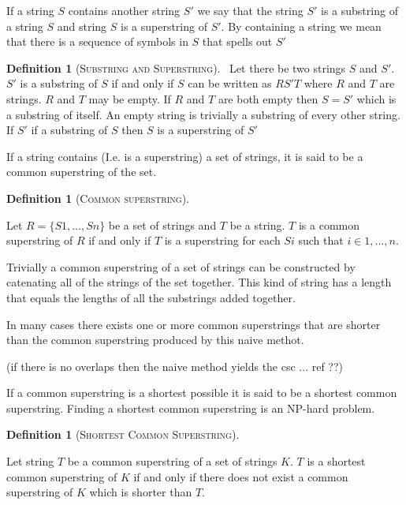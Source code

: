 \documentclass[english,twoside,censored,csm,algorithms-track-2020]{HYthesisML}
\theoremstyle{plain}
\theoremstyle{definition}
\newtheorem{definition}[theorem]{Definition}
\begin{document}
If a string $S$ contains another string $S'$ we say that the string $S'$ is a substring of a string $S$ and string $S$ is a superstring of $S'$.
By containing a string we mean that there is a sequence of symbols in $S$ that spells out $S'$

\begin{definition}[\textsc{Substring and Superstring}]~\label{def-sub-super}
  Let there be two strings $S$ and $S'$.
  $S'$ is a substring of $S$ if and only if $S$ can be written as $RS'T$ where $R$ and $T$ are strings. $R$ and $T$ may be empty.
  If $R$ and $T$ are both empty then $S = S'$ which is a substring of itself.
  An empty string is trivially a substring of every other string.\\

  If $S'$ if a substring of $S$ then $S$ is a superstring of $S'$
\end{definition}

If a string contains (I.e. is a superstring) a set of strings, it is said to be a common superstring of the set.

\begin{definition}[\textsc{Common superstring}]~\label{def-cs}

  Let $R = \{S1,...,Sn\}$ be a set of strings and $T$ be a string.
  $T$ is a common superstring of $R$ if and only if $T$ is a superstring for each $Si$ such that $i\in 1,...,n$.
  
\end{definition}

Trivially a common superstring of a set of strings can be constructed by catenating all of the strings of the set together.
This kind of string has a length that equals the lengths of all the substrings added together.

In many cases there exists one or more common superstrings that are shorter than the common superstring produced by this naive methot.

(if there is no overlaps then the naive method yields the csc ... ref ??)

If a common superstring is a shortest possible it is said to be a shortest common superstring. Finding a shortest common superstring is
an \textsc{NP}-hard problem. 

\begin{definition}[\textsc{Shortest Common Superstring}]~\label{def-scs}

  Let string $T$ be a common superstring of a set of strings $K$.
  $T$ is a shortest common superstring of $K$ if and only if there does not exist a common superstring of $K$ which is shorter than $T$.
  
\end{definition}
\end{document}
